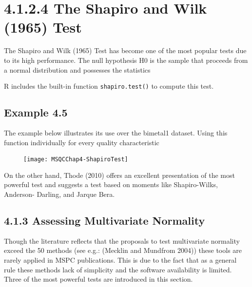 \documentclass[]{beamer}
\begin{document}
\section{4.1.2.4 The Shapiro and Wilk (1965) Test}
\begin{frame}
The Shapiro and Wilk (1965) Test has become one of the most popular tests due to
its high performance.
The null hypothesis H0 is the sample that proceeds from a normal distribution
and possesses the statistics


R includes the built-in function \texttt{shapiro.test()} to compute this test.
\end{frame}
\subsection{Example 4.5}
\begin{frame}
The example below illustrates its use over the bimetal1 dataset. Using this function
individually for every quality characteristic
\begin{figure}
\centering
\texttt{[image: MSQCChap4-ShapiroTest]}
\caption{}
\label{fig:MSQCChap4-ShapiroTest}
\end{figure}

\end{frame}
\begin{frame}
On the other hand, Thode (2010) offers an excellent presentation of the most
powerful test and suggests a test based on moments like Shapiro-Wilks, Anderson-
Darling, and Jarque Bera. 

\end{frame}

\subsection{4.1.3 Assessing Multivariate Normality}
\begin{frame}[fragile]
	
Though the literature reflects that the proposals to test multivariate normality
exceed the 50 methods (see e.g.: (Mecklin and Mundfrom 2004)) these tools are
rarely applied in MSPC publications. This is due to the fact that as a general rule
these methods lack of simplicity and the software availability is limited.
Three of the most powerful tests are introduced in this section.

\end{frame}
\end{document}

